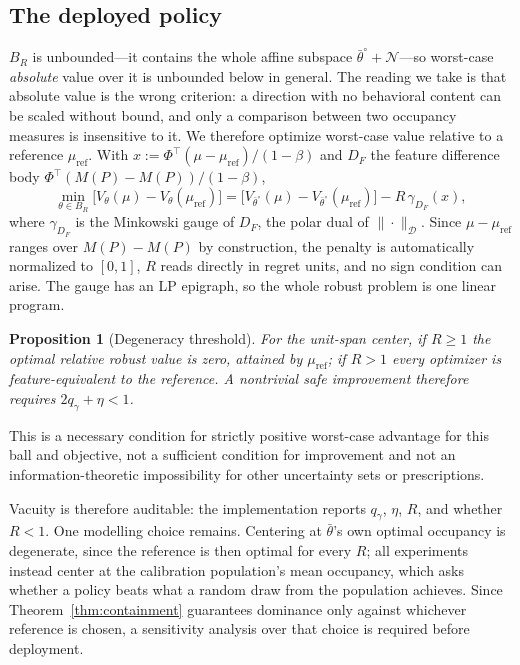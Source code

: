 \documentclass{article}
\newtheorem{proposition}{Proposition}
\newcommand{\Dnorm}[1]{\|#1\|_{\mathcal D}}
\begin{document}
\subsection{The deployed policy}
\label{sec:policy}

$B_R$ is unbounded---it contains the whole affine subspace
$\bar\theta^\circ+\mathcal N$---so worst-case \emph{absolute} value over it is
unbounded below in general. The reading we take is that absolute value is the
wrong criterion: a
direction with no behavioral content can be scaled without bound, and only a
comparison between two occupancy measures is insensitive to it. We therefore
optimize worst-case value relative to a reference $\mu_{\mathrm{ref}}$. With
$x:=\Phi^\top(\mu-\mu_{\mathrm{ref}})/(1-\beta)$ and $D_F$ the feature
difference body $\Phi^\top(M(P)-M(P))/(1-\beta)$,
\[
\min_{\theta\in B_R}\big[V_\theta(\mu)-V_\theta(\mu_{\mathrm{ref}})\big]
=\big[V_{\bar\theta^\circ}(\mu)-V_{\bar\theta^\circ}(\mu_{\mathrm{ref}})\big]
-R\,\gamma_{D_F}(x),
\]
where $\gamma_{D_F}$ is the Minkowski gauge of $D_F$, the polar dual of
$\Dnorm{\cdot}$. Since $\mu-\mu_{\mathrm{ref}}$ ranges over $M(P)-M(P)$ by
construction, the penalty is automatically normalized to $[0,1]$, $R$ reads
directly in regret units, and no sign condition can arise. The gauge has an LP
epigraph, so the whole robust problem is one linear program.

\begin{proposition}[Degeneracy threshold]
\label{prop:degeneracy}
For the unit-span center, if $R\ge1$ the optimal relative robust value is zero,
attained by $\mu_{\mathrm{ref}}$; if $R>1$ every optimizer is feature-equivalent
to the reference. A nontrivial safe improvement therefore requires
$2q_\gamma+\eta<1$.
\end{proposition}

This is a necessary condition for strictly positive worst-case advantage for
this ball and objective, not a sufficient condition for improvement and not an
information-theoretic impossibility for other uncertainty sets or prescriptions.

Vacuity is therefore auditable: the implementation reports $q_\gamma$, $\eta$,
$R$, and whether $R<1$. One modelling choice remains. Centering at
$\bar\theta$'s own optimal occupancy is degenerate, since the reference is then
optimal for every $R$; all experiments instead center at the calibration
population's mean occupancy, which asks whether a policy beats what a random
draw from the population achieves. Since
Theorem~\ref{thm:containment} guarantees dominance only against whichever
reference is chosen, a sensitivity analysis over that choice is required before
deployment.
\end{document}
